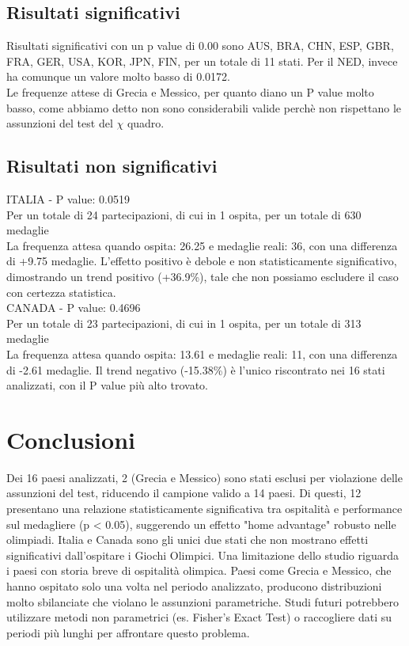 \documentclass{article}
\begin{document}
\subsection{Risultati significativi}
Risultati significativi con un p value di 0.00 sono AUS, BRA, CHN, ESP, GBR, FRA, 
GER, USA, KOR, JPN, FIN, per un totale di 11 stati. Per il NED, invece ha comunque
un valore molto basso di 0.0172.\\
Le frequenze attese di Grecia e Messico, per quanto diano un P value molto basso, 
come abbiamo detto non sono considerabili valide perchè non rispettano le assunzioni 
del test del $\chi$ quadro.

\subsection{Risultati non significativi}

ITALIA - P value: 0.0519\\
Per un totale di 24 partecipazioni, di cui in 1 ospita, per un totale di 630 medaglie \\
La frequenza attesa quando ospita: 26.25 e medaglie reali: 36, con una differenza 
di +9.75 medaglie. 
L'effetto positivo è debole e non statisticamente significativo, dimostrando un 
trend positivo (+36.9\%), tale che non possiamo escludere il caso con certezza statistica.\\
CANADA - P value: 0.4696\\
Per un totale di 23 partecipazioni, di cui in 1 ospita, per un totale di 313 medaglie\\
La frequenza attesa quando ospita: 13.61 e medaglie reali: 11, con una differenza 
di -2.61 medaglie.
Il trend negativo (-15.38\%) è l'unico riscontrato nei 16 stati analizzati, 
con il P value più alto trovato. 


\section{Conclusioni}
Dei 16 paesi analizzati, 2 (Grecia e Messico) sono stati esclusi per violazione delle
assunzioni del test, riducendo il campione valido a 14 paesi. Di questi, 12 
presentano una relazione statisticamente significativa tra ospitalità e performance sul 
medagliere (p < 0.05), suggerendo un effetto "home advantage" robusto nelle olimpiadi.
Italia e Canada sono gli unici due stati che non mostrano effetti significativi 
dall'ospitare i Giochi Olimpici.
Una limitazione dello studio riguarda i paesi con storia breve di ospitalità 
olimpica. Paesi come Grecia e Messico, che hanno ospitato solo una volta nel 
periodo analizzato, producono distribuzioni molto sbilanciate che violano le assunzioni 
parametriche. Studi futuri potrebbero utilizzare metodi non parametrici 
(es. Fisher's Exact Test) o raccogliere dati su periodi più lunghi per affrontare 
questo problema.
\end{document}

